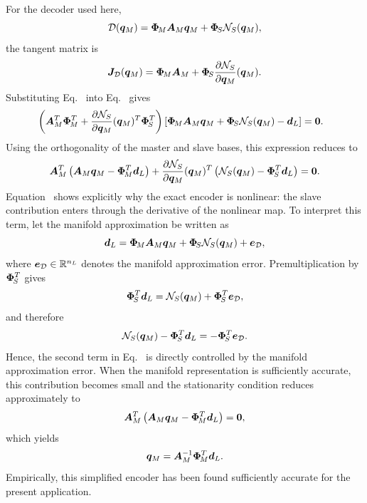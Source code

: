\documentclass[11pt,a4paper]{article}
\begin{document}
For the decoder used here,
\[
    \mathcal{\boldsymbol{D}}(\bm{q}_M)
    =
    \bm{\Phi}_{\!M}\bm{A}_{M}\bm{q}_M+\bm{\Phi}_{\!S}\mathcal{N}_{S}(\bm{q}_M),
\]
the tangent matrix is
\begin{equation}
\label{eq:Jdec_master_slave}
    \bm{J}_{\mathcal{D}}(\bm{q}_M)
    =
    \bm{\Phi}_{\!M}\bm{A}_{M}
    +
    \bm{\Phi}_{\!S}
    \dfrac{\partial \mathcal{N}_{S}}{\partial \bm{q}_M}(\bm{q}_M).
\end{equation}
Substituting Eq.~ into
Eq.~ gives
\begin{equation}
\label{eq:encoder_normal_expanded}
\begin{aligned}
&
\left(
    \bm{A}_{M}^T\bm{\Phi}_{\!M}^T
    +
    \dfrac{\partial \mathcal{N}_{S}}{\partial \bm{q}_M}(\bm{q}_M)^T\bm{\Phi}_{\!S}^T
\right)
\left[
    \bm{\Phi}_{\!M}\bm{A}_{M}\bm{q}_M
    +
    \bm{\Phi}_{\!S}\mathcal{N}_{S}(\bm{q}_M)
    -
    \bm{d}_L
\right]
=
\bm{0}.
\end{aligned}
\end{equation}
Using the orthogonality of the master and slave bases, this expression reduces
to
\begin{equation}
\label{eq:encoder_normal_split}
    \bm{A}_{M}^T
    \left(
        \bm{A}_{M}\bm{q}_M-\bm{\Phi}_{\!M}^T\bm{d}_L
    \right)
    +
    \dfrac{\partial \mathcal{N}_{S}}{\partial \bm{q}_M}(\bm{q}_M)^T
    \left(
        \mathcal{N}_{S}(\bm{q}_M)-\bm{\Phi}_{\!S}^T\bm{d}_L
    \right)
    =
    \bm{0}.
\end{equation}
Equation~ shows explicitly why the exact
encoder is nonlinear: the slave contribution enters through the derivative of
the nonlinear map. To interpret this term, let the manifold approximation be
written as
\begin{equation}
\label{eq:decoder_with_error}
    \bm{d}_L
    =
    \bm{\Phi}_{\!M}\bm{A}_{M}\bm{q}_M
    +
    \bm{\Phi}_{\!S}\mathcal{N}_{S}(\bm{q}_M)
    +
    \bm{e}_{\mathcal{D}} ,
\end{equation}
where $\bm{e}_{\mathcal{D}}\in\mathbb{R}^{n_L}$ denotes the manifold approximation error.
Premultiplication by $\bm{\Phi}_{\!S}^T$ gives
\[
    \bm{\Phi}_{\!S}^T\bm{d}_L
    =
    \mathcal{N}_{S}(\bm{q}_M)
    +
    \bm{\Phi}_{\!S}^T\bm{e}_{\mathcal{D}} ,
\]
and therefore
\[
    \mathcal{N}_{S}(\bm{q}_M)-\bm{\Phi}_{\!S}^T\bm{d}_L
    =
    -\bm{\Phi}_{\!S}^T\bm{e}_{\mathcal{D}} .
\]
Hence, the second term in Eq.~ is directly
controlled by the manifold approximation error. When the manifold
representation is sufficiently accurate, this contribution becomes small and
the stationarity condition reduces approximately to
\[
    \bm{A}_{M}^T
    \left(
        \bm{A}_{M}\bm{q}_M-\bm{\Phi}_{\!M}^T\bm{d}_L
    \right)
    =
    \bm{0},
\]
which yields
\begin{equation}
\label{eq:encoder_explicit}
    \bm{q}_M
    =
    \bm{A}_{M}^{-1}\bm{\Phi}_{\!M}^T\bm{d}_L .
\end{equation}
Empirically, this simplified encoder has been found sufficiently accurate for
the present application.
\end{document}
